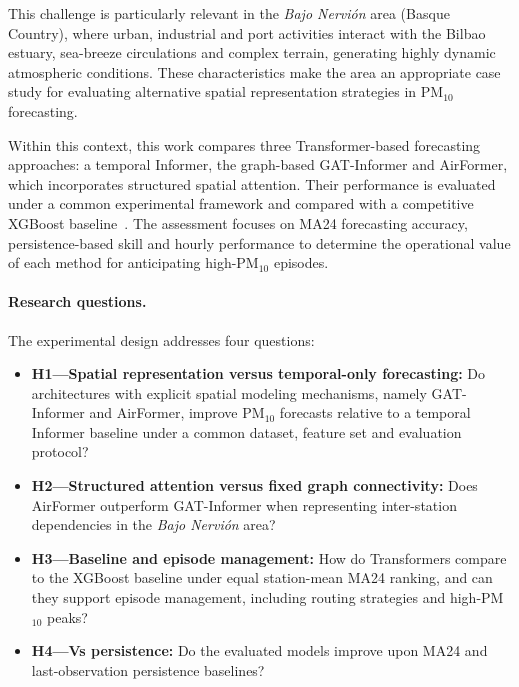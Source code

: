 \documentclass[11pt]{article}
\begin{document}
This challenge is particularly relevant in the \textit{Bajo Nervi\'on} area (Basque Country), where urban, industrial and port activities interact with the Bilbao estuary, sea-breeze circulations and complex terrain, generating highly dynamic atmospheric conditions. These characteristics make the area an appropriate case study for evaluating alternative spatial representation strategies in PM$_{10}$ forecasting.

Within this context, this work compares three Transformer-based forecasting approaches: a temporal Informer, the graph-based GAT-Informer and AirFormer, which incorporates structured spatial attention. Their performance is evaluated under a common experimental framework and compared with a competitive XGBoost baseline~\cite{Chen2016XGBoost}. The assessment focuses on MA24 forecasting accuracy, persistence-based skill and hourly performance to determine the operational value of each method for anticipating high-PM$_{10}$ episodes.

\paragraph{Research questions.}
The experimental design addresses four questions:
\begin{itemize}[leftmargin=1.4em,itemsep=0.25em]
\item \textbf{H1---Spatial representation versus temporal-only forecasting:} Do architectures with explicit spatial modeling mechanisms, namely GAT-Informer and AirFormer, improve PM$_{10}$ forecasts relative to a temporal Informer baseline under a common dataset, feature set and evaluation protocol?
\item \textbf{H2---Structured attention versus fixed graph connectivity:} Does AirFormer outperform GAT-Informer when representing inter-station dependencies in the \textit{Bajo Nervi\'on} area?
\item \textbf{H3---Baseline and episode management:} How do Transformers compare to the XGBoost baseline under equal station-mean MA24 ranking, and can they support episode management, including routing strategies and high-PM$_{10}$ peaks?
\item \textbf{H4---Vs persistence:} Do the evaluated models improve upon MA24 and last-observation persistence baselines?
\end{itemize}
\end{document}
